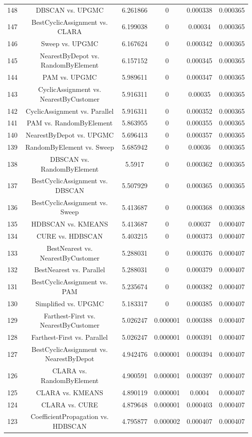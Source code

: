 \documentclass[a4paper,10pt]{article}
\begin{document}
\begin{landscape}
\begin{table}[!htp]
\begin{tabular}{cccccc}
148&DBSCAN vs. UPGMC&6.261866&0&0.000338&0.000365\\
147&BestCyclicAssignment vs. CLARA&6.199038&0&0.00034&0.000365\\
146&Sweep vs. UPGMC&6.167624&0&0.000342&0.000365\\
145&NearestByDepot vs. RandomByElement&6.157152&0&0.000345&0.000365\\
144&PAM vs. UPGMC&5.989611&0&0.000347&0.000365\\
143&CyclicAssignment vs. NearestByCustomer&5.916311&0&0.00035&0.000365\\
142&CyclicAssignment vs. Parallel&5.916311&0&0.000352&0.000365\\
141&PAM vs. RandomByElement&5.863955&0&0.000355&0.000365\\
140&NearestByDepot vs. UPGMC&5.696413&0&0.000357&0.000365\\
139&RandomByElement vs. Sweep&5.685942&0&0.00036&0.000365\\
138&DBSCAN vs. RandomByElement&5.5917&0&0.000362&0.000365\\
137&BestCyclicAssignment vs. DBSCAN&5.507929&0&0.000365&0.000365\\
136&BestCyclicAssignment vs. Sweep&5.413687&0&0.000368&0.000368\\
135&HDBSCAN vs. KMEANS&5.413687&0&0.00037&0.000407\\
134&CURE vs. HDBSCAN&5.403215&0&0.000373&0.000407\\
133&BestNearest vs. NearestByCustomer&5.288031&0&0.000376&0.000407\\
132&BestNearest vs. Parallel&5.288031&0&0.000379&0.000407\\
131&BestCyclicAssignment vs. PAM&5.235674&0&0.000382&0.000407\\
130&Simplified vs. UPGMC&5.183317&0&0.000385&0.000407\\
129&Farthest-First vs. NearestByCustomer&5.026247&0.000001&0.000388&0.000407\\
128&Farthest-First vs. Parallel&5.026247&0.000001&0.000391&0.000407\\
127&BestCyclicAssignment vs. NearestByDepot&4.942476&0.000001&0.000394&0.000407\\
126&CLARA vs. RandomByElement&4.900591&0.000001&0.000397&0.000407\\
125&CLARA vs. KMEANS&4.890119&0.000001&0.0004&0.000407\\
124&CLARA vs. CURE&4.879648&0.000001&0.000403&0.000407\\
123&CoefficientPropagation vs. HDBSCAN&4.795877&0.000002&0.000407&0.000407\\

\end{tabular}
\end{table}
\end{landscape}
\end{document}
